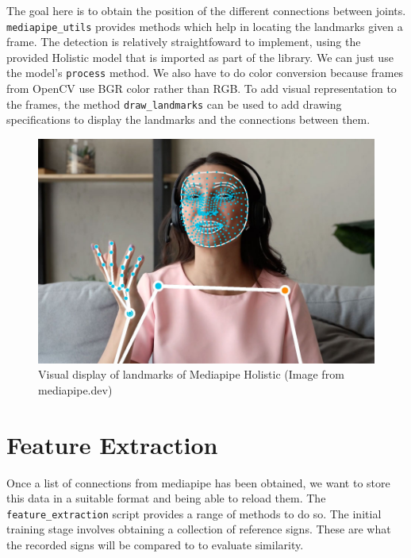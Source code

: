 \documentclass[final,dissertation.tex]{subfiles}
\begin{document}
The goal here is to obtain the position of the different connections between joints.
\newline \verb|mediapipe_utils| provides methods which help in locating the landmarks given a frame. The detection is relatively straightfoward to implement, using the provided Holistic model that is imported as part of the library. We can just use the model's \verb|process| method. We also have to do color conversion because frames from OpenCV use BGR color rather than RGB. To add visual representation to the frames, the method \verb|draw_landmarks| can be used to add drawing specifications to display the landmarks and the connections between them.

\begin{figure}[H]
    \begin{center}
        \includegraphics[scale=0.3]{images/holistic.jpg}
        \caption[caption]{Visual display of landmarks of Mediapipe Holistic (Image from mediapipe.dev)}
    \end{center}
\end{figure}



\section{Feature Extraction}

Once a list of connections from mediapipe has been obtained, we want to store this data in a suitable format and being able to reload them. The \verb|feature_extraction| script provides a range of methods to do so. The initial training stage involves obtaining a collection of reference signs. These are what the recorded signs will be compared to to evaluate similarity.
\end{document}
